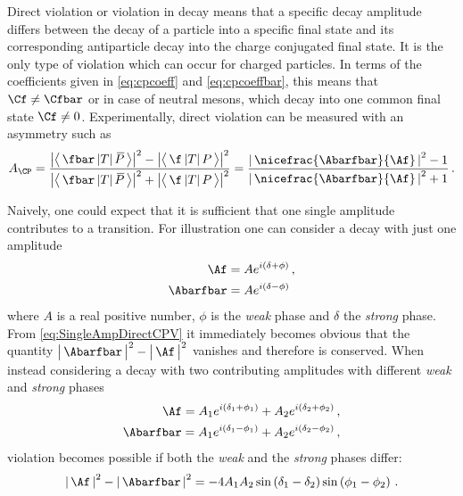 Direct \CP violation or \CP violation in decay means that a specific decay amplitude differs between the decay of a particle into a specific final state and its corresponding antiparticle decay into the charge conjugated final state.
It is the only type of \CP violation which can occur for charged particles.
In terms of the \CP coefficients given in \cref{eq:cpcoeff} and \cref{eq:cpcoeffbar}, this means that $\Cf\neq\Cfbar$ or in case of neutral mesons, which decay into one common final state $\Cf\neq0$.
Experimentally, direct \CP violation can be measured with an asymmetry such as
\begin{equation}
A_{\CP}=\frac{\big|\big<\,\fbar\,|T|\,\kern 0.18em\overline{\kern -0.18em P}\,\big>\big|^2-\big|\big<\,\f\,|T|\,P\,\big>\big|^2}{\big|\big<\,\fbar\,|T|\,\kern 0.18em\overline{\kern -0.18em P}\,\big>\big|^2+\big|\big<\,\f\,|T|\,P\,\big>\big|^2} = \frac{\left|\,\nicefrac{\Abarfbar}{\Af}\,\right|^2-1}{\left|\,\nicefrac{\Abarfbar}{\Af}\,\right|^2+1}\,.
\end{equation}

Naively, one could expect that it is sufficient that one single amplitude contributes to a transition.
For illustration one can consider a decay with just one amplitude
\begin{equation}
\begin{split}
\Af&=Ae^{i\left(\delta+\phi\right)}\,,\\
\Abarfbar&=Ae^{i\left(\delta-\phi\right)}\label{eq:SingleAmpDirectCPV}
\end{split}
\end{equation}
where $A$ is a real positive number, $\phi$ is the \emph{weak} phase and $\delta$ the \emph{strong} phase.
From \cref{eq:SingleAmpDirectCPV} it immediately becomes obvious that the quantity $\big|\,\Abarfbar\,\big|^2-\big|\,\Af\,\big|^2$ vanishes and therefore \CP is conserved.
When instead considering a decay with two contributing amplitudes with different \emph{weak} and \emph{strong} phases
\begin{equation}
\begin{split}
\Af=A_1e^{i\left(\delta_1+\phi_1\right)}+A_2e^{i\left(\delta_2+\phi_2\right)}\,,\\
\Abarfbar=A_1e^{i\left(\delta_1-\phi_1\right)}+A_2e^{i\left(\delta_2-\phi_2\right)}\,,
\end{split}
\end{equation}
\CP violation becomes possible if both the \emph{weak} and the \emph{strong} phases differ:
\begin{equation}
\left|\,\Af\,\right|^2-\left|\,\Abarfbar\,\right|^2=-4A_1A_2\sin\left(\delta_1-\delta_2\right)\sin\left(\phi_1-\phi_2\right)\,.
\end{equation}

